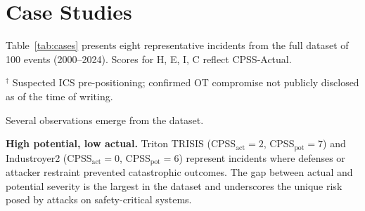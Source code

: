 \documentclass[11pt]{article}
\begin{document}
\section{Case Studies}

Table~\ref{tab:cases} presents eight representative incidents
from the full dataset of 100 events (2000--2024).
Scores for H, E, I, C reflect CPSS-Actual.

\begin{table}[t]
\centering
\caption{Selected ICS cyber incidents scored under CPSS}
\label{tab:cases}
\end{table}
\noindent$^\dagger$ Suspected ICS pre-positioning; confirmed OT compromise not publicly disclosed as of the time of writing.

Several observations emerge from the dataset.

\textbf{High potential, low actual.}
Triton TRISIS (CPSS$_\text{act}=2$, CPSS$_\text{pot}=7$) and
Industroyer2 (CPSS$_\text{act}=0$, CPSS$_\text{pot}=6$) represent
incidents where defenses or attacker restraint prevented catastrophic
outcomes. The gap between actual and potential severity is the largest
in the dataset and underscores the unique risk posed by attacks on
safety-critical systems.
\end{document}
